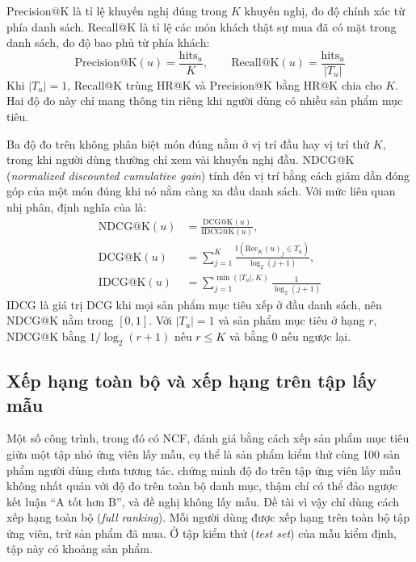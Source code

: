 Precision@K là tỉ lệ khuyến nghị đúng trong $K$ khuyến nghị, đo độ chính xác từ phía danh sách. Recall@K là tỉ lệ các món khách thật sự mua đã có mặt trong danh sách, đo độ bao phủ từ phía khách:
\begin{equation}
    \text{Precision@K}(u) = \frac{\text{hits}_u}{K}, \qquad \text{Recall@K}(u) = \frac{\text{hits}_u}{|T_u|}
    \label{eq:precision_recall}
\end{equation}
Khi $|T_u| = 1$, Recall@K trùng HR@K và Precision@K bằng HR@K chia cho $K$. Hai độ đo này chỉ mang thông tin riêng khi người dùng có nhiều sản phẩm mục tiêu.

Ba độ đo trên không phân biệt món đúng nằm ở vị trí đầu hay vị trí thứ $K$, trong khi người dùng thường chỉ xem vài khuyến nghị đầu. NDCG@K (\textit{normalized discounted cumulative gain}) tính đến vị trí bằng cách giảm dần đóng góp của một món đúng khi nó nằm càng xa đầu danh sách. Với mức liên quan nhị phân, định nghĩa của \textcite{jarvelin2002} là:
\begin{equation}
    \begin{aligned}
        \text{NDCG@K}(u) &= \frac{\text{DCG@K}(u)}{\text{IDCG@K}(u)}, \\
        \text{DCG@K}(u) &= \sum_{j=1}^{K} \frac{\mathbb{I}(\text{Rec}_K(u)_j \in T_u)}{\log_2(j + 1)}, \\
        \text{IDCG@K}(u) &= \sum_{j=1}^{\min(|T_u|, K)} \frac{1}{\log_2(j + 1)}
    \end{aligned}
    \label{eq:ndcg_k}
\end{equation}
IDCG là giá trị DCG khi mọi sản phẩm mục tiêu xếp ở đầu danh sách, nên NDCG@K nằm trong $[0, 1]$. Với $|T_u| = 1$ và sản phẩm mục tiêu ở hạng $r$, NDCG@K bằng $1/\log_2(r+1)$ nếu $r \le K$ và bằng 0 nếu ngược lại.

\subsection{Xếp hạng toàn bộ và xếp hạng trên tập lấy mẫu}

Một số công trình, trong đó có NCF, đánh giá bằng cách xếp sản phẩm mục tiêu giữa một tập nhỏ ứng viên lấy mẫu, cụ thể là sản phẩm kiểm thử cùng 100 sản phẩm người dùng chưa tương tác. \textcite{krichene2020sampled} chứng minh độ đo trên tập ứng viên lấy mẫu không nhất quán với độ đo trên toàn bộ danh mục, thậm chí có thể đảo ngược kết luận ``A tốt hơn B'', và đề nghị không lấy mẫu. Đề tài vì vậy chỉ dùng cách xếp hạng toàn bộ (\textit{full ranking}). Mỗi người dùng được xếp hạng trên toàn bộ tập ứng viên, trừ sản phẩm đã mua. Ở tập kiểm thử (\textit{test set}) của mẫu kiểm định, tập này có khoảng  sản phẩm.


